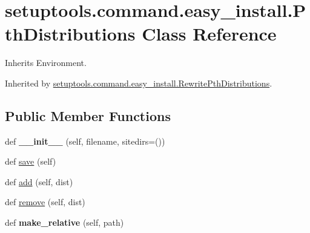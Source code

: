 \hypertarget{classsetuptools_1_1command_1_1easy__install_1_1_pth_distributions}{}\section{setuptools.\+command.\+easy\+\_\+install.\+Pth\+Distributions Class Reference}
\label{classsetuptools_1_1command_1_1easy__install_1_1_pth_distributions}


Inherits Environment.



Inherited by \hyperlink{classsetuptools_1_1command_1_1easy__install_1_1_rewrite_pth_distributions}{setuptools.\+command.\+easy\+\_\+install.\+Rewrite\+Pth\+Distributions}.

\subsection*{Public Member Functions}
\begin{DoxyCompactItemize}
\item 
\mbox{\label{classsetuptools_1_1command_1_1easy__install_1_1_pth_distributions_a1ca1a1ca566543e0e54d7ae015a16dc5}} 
def {\bfseries \+\_\+\+\_\+init\+\_\+\+\_\+} (self, filename, sitedirs=())
\item 
def \hyperlink{classsetuptools_1_1command_1_1easy__install_1_1_pth_distributions_ab4d9f759b78444fc81dd9d9219c11031}{save} (self)
\item 
def \hyperlink{classsetuptools_1_1command_1_1easy__install_1_1_pth_distributions_a9225a5df3c1a4af13a45aa4d92e83cbf}{add} (self, dist)
\item 
def \hyperlink{classsetuptools_1_1command_1_1easy__install_1_1_pth_distributions_ae249a3d2339aedfa56143112cb755032}{remove} (self, dist)
\item 
\mbox{\label{classsetuptools_1_1command_1_1easy__install_1_1_pth_distributions_a0dbff6cabb5ea6864cc70563aef90507}} 
def {\bfseries make\+\_\+relative} (self, path)
\end{DoxyCompactItemize}
